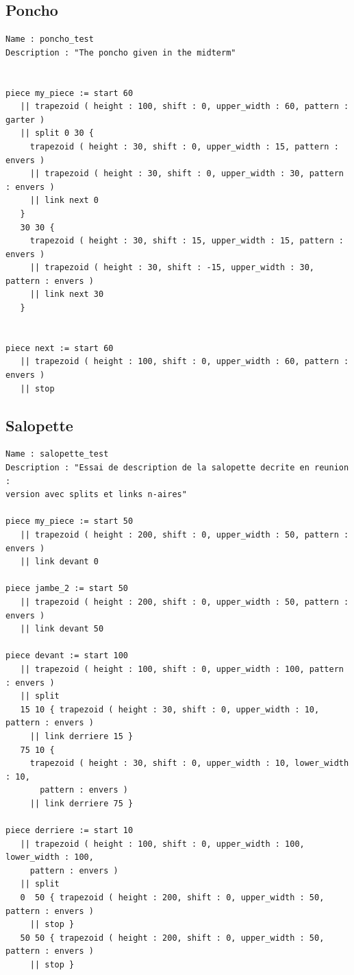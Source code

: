 \documentclass[a4paper,10pt]{article}
\begin{document}
\subsection{Poncho}

\begin{lstlisting}
Name : poncho_test
Description : "The poncho given in the midterm"


piece my_piece := start 60
   || trapezoid ( height : 100, shift : 0, upper_width : 60, pattern : garter )
   || split 0 30 { 
     trapezoid ( height : 30, shift : 0, upper_width : 15, pattern : envers )
     || trapezoid ( height : 30, shift : 0, upper_width : 30, pattern : envers )
     || link next 0
   }
   30 30 { 
     trapezoid ( height : 30, shift : 15, upper_width : 15, pattern : envers )
     || trapezoid ( height : 30, shift : -15, upper_width : 30, pattern : envers )
     || link next 30
   }


piece next := start 60
   || trapezoid ( height : 100, shift : 0, upper_width : 60, pattern : envers )
   || stop
\end{lstlisting}

\subsection{Salopette}

%

\begin{lstlisting}
Name : salopette_test
Description : "Essai de description de la salopette decrite en reunion : 
version avec splits et links n-aires"

piece my_piece := start 50
   || trapezoid ( height : 200, shift : 0, upper_width : 50, pattern : envers )
   || link devant 0

piece jambe_2 := start 50
   || trapezoid ( height : 200, shift : 0, upper_width : 50, pattern : envers )
   || link devant 50

piece devant := start 100
   || trapezoid ( height : 100, shift : 0, upper_width : 100, pattern : envers )
   || split
   15 10 { trapezoid ( height : 30, shift : 0, upper_width : 10, pattern : envers )
     || link derriere 15 }
   75 10 { 
     trapezoid ( height : 30, shift : 0, upper_width : 10, lower_width : 10, 
       pattern : envers )
     || link derriere 75 }

piece derriere := start 10
   || trapezoid ( height : 100, shift : 0, upper_width : 100, lower_width : 100, 
     pattern : envers )
   || split
   0  50 { trapezoid ( height : 200, shift : 0, upper_width : 50, pattern : envers )
     || stop }
   50 50 { trapezoid ( height : 200, shift : 0, upper_width : 50, pattern : envers )
     || stop }
\end{lstlisting}
\end{document}
